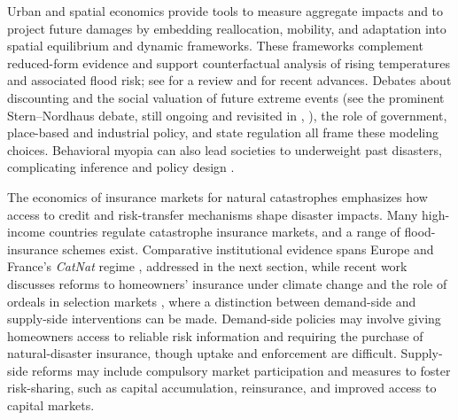 Urban and spatial economics provide tools to measure aggregate impacts and to project future damages by embedding reallocation, mobility, and adaptation into spatial equilibrium and dynamic frameworks. These frameworks complement reduced-form evidence and support counterfactual analysis of rising temperatures and associated flood risk; see \cite{carleton2024adaptation} for a review and \cite{balboni2025spatial} for recent advances. Debates about discounting and the social valuation of future extreme events (see the prominent Stern–Nordhaus debate, still ongoing and revisited in \citeauthor{stern2023climate}, \citeyear{stern2023climate}), the role of government, place-based and industrial policy, and state regulation all frame these modeling choices. Behavioral myopia can also lead societies to underweight past disasters, complicating inference and policy design \citep{gallagher2014learning}.

The economics of insurance markets for natural catastrophes emphasizes how access to credit and risk-transfer mechanisms shape disaster impacts. Many high-income countries regulate catastrophe insurance markets, and a range of flood-insurance schemes exist. Comparative institutional evidence spans Europe \citep{bock2024flood} and France’s \textit{CatNat} regime \citep{grislain2018natural}, addressed in the next section, while recent work discusses reforms to homeowners’ insurance under climate change \citep{boomhower2024insurance} and the role of ordeals in selection markets \citep{wagner2022adaptation}, where a distinction between demand-side and supply-side interventions can be made. Demand-side policies may involve giving homeowners access to reliable risk information and requiring the purchase of natural-disaster insurance, though uptake and enforcement are difficult. Supply-side reforms may include compulsory market participation and measures to foster risk-sharing, such as capital accumulation, reinsurance, and improved access to capital markets.

